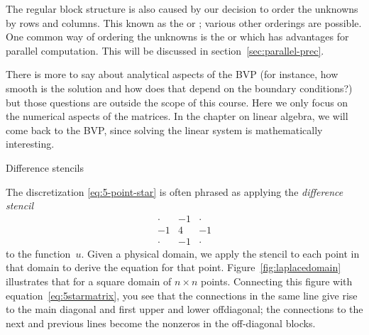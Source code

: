 The regular block structure is also caused by our decision to order
the unknowns by rows and columns. This known as the  or ; various other orderings are
possible. One common way of ordering the unknowns is the
 or  which has advantages for parallel computation. This will
be discussed in section~\ref{sec:parallel-prec}.

There is more to say about analytical aspects of the \ac{BVP} (for
instance, how smooth is the solution and how does that depend on the
boundary conditions?) but those questions are outside the scope of
this course. Here we only focus on the numerical aspects of the
matrices. In the  chapter on linear algebra, we will come back to the
\ac{BVP}, since solving the linear system is mathematically interesting.

 {Difference stencils}

The discretization \eqref{eq:5-point-star} is often phrased as
applying the
%
\emph{difference stencil}%
%
%
\[
\begin{matrix}
  \cdot&-1&\cdot\\ -1&4&-1\\ \cdot&-1&\cdot
\end{matrix}
\]
to the function~$u$. Given a physical domain, we apply the stencil to
each point in that domain to derive the equation for that
point. Figure~\ref{fig:laplacedomain} illustrates that for a square domain
of $n\times n$ points.
Connecting this figure with equation~\eqref{eq:5starmatrix}, you
see that the connections in the same line give rise to the main
diagonal and first upper and lower offdiagonal; the connections to the
next and previous lines become the nonzeros in the off-diagonal
blocks.

